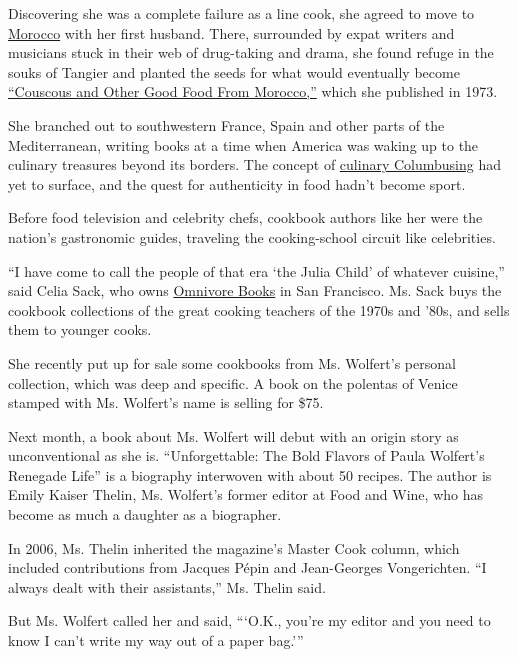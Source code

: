 Discovering she was a complete failure as a line cook, she agreed to
move to
\href{http://www.nytimes3xbfgragh.onion/2011/10/05/dining/two-directions-for-moroccan-cuisine-modern-or-classic.html}{Morocco}
with her first husband. There, surrounded by expat writers and musicians
stuck in their web of drug-taking and drama, she found refuge in the
souks of Tangier and planted the seeds for what would eventually become
\href{https://www.harpercollins.com/9780060913960/couscous-and-other-good-food-from-morocco}{``Couscous
and Other Good Food From Morocco,''} which she published in 1973.

She branched out to southwestern France, Spain and other parts of the
Mediterranean, writing books at a time when America was waking up to the
culinary treasures beyond its borders. The concept of
\href{https://www.nytimes3xbfgragh.onion/2016/12/22/nyregion/chopped-cheese-ginia-bellafante.html}{culinary
Columbusing} had yet to surface, and the quest for authenticity in food
hadn't become sport.

Before food television and celebrity chefs, cookbook authors like her
were the nation's gastronomic guides, traveling the cooking-school
circuit like celebrities.

``I have come to call the people of that era `the Julia Child' of
whatever cuisine,'' said Celia Sack, who owns
\href{http://omnivorebooks.com/}{Omnivore Books} in San Francisco. Ms.
Sack buys the cookbook collections of the great cooking teachers of the
1970s and '80s, and sells them to younger cooks.

She recently put up for sale some cookbooks from Ms. Wolfert's personal
collection, which was deep and specific. A book on the polentas of
Venice stamped with Ms. Wolfert's name is selling for \$75.

Next month, a book about Ms. Wolfert will debut with an origin story as
unconventional as she is. ``Unforgettable: The Bold Flavors of Paula
Wolfert's Renegade Life'' is a biography interwoven with about 50
recipes. The author is Emily Kaiser Thelin, Ms. Wolfert's former editor
at Food and Wine, who has become as much a daughter as a biographer.

In 2006, Ms. Thelin inherited the magazine's Master Cook column, which
included contributions from Jacques Pépin and Jean-Georges Vongerichten.
``I always dealt with their assistants,'' Ms. Thelin said.

But Ms. Wolfert called her and said, ```O.K., you're my editor and you
need to know I can't write my way out of a paper bag.'''

